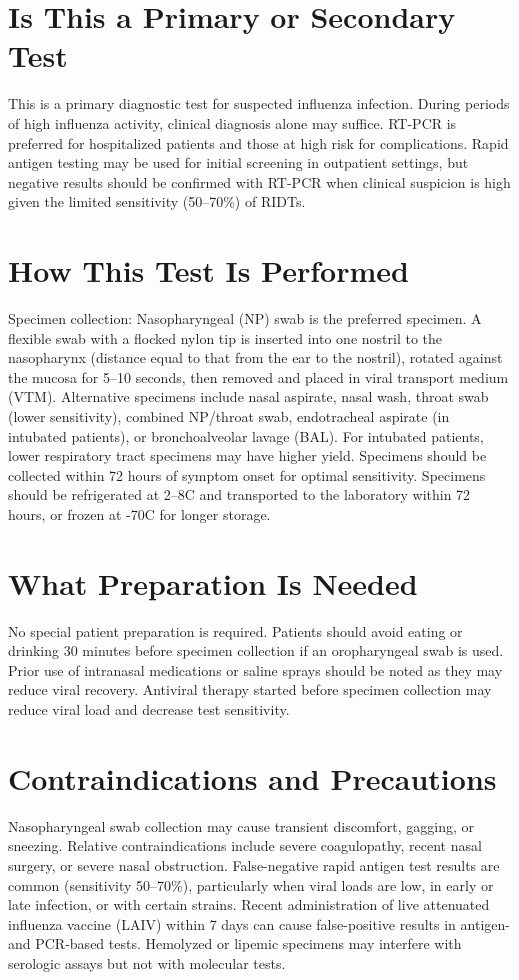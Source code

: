 \section*{Is This a Primary or Secondary Test}
This is a primary diagnostic test for suspected influenza infection. During periods of high influenza activity, clinical diagnosis alone may suffice. RT-PCR is preferred for hospitalized patients and those at high risk for complications. Rapid antigen testing may be used for initial screening in outpatient settings, but negative results should be confirmed with RT-PCR when clinical suspicion is high given the limited sensitivity (50--70\%) of RIDTs.

\section*{How This Test Is Performed}
Specimen collection: Nasopharyngeal (NP) swab is the preferred specimen. A flexible swab with a flocked nylon tip is inserted into one nostril to the nasopharynx (distance equal to that from the ear to the nostril), rotated against the mucosa for 5--10 seconds, then removed and placed in viral transport medium (VTM). Alternative specimens include nasal aspirate, nasal wash, throat swab (lower sensitivity), combined NP/throat swab, endotracheal aspirate (in intubated patients), or bronchoalveolar lavage (BAL). For intubated patients, lower respiratory tract specimens may have higher yield. Specimens should be collected within 72 hours of symptom onset for optimal sensitivity. Specimens should be refrigerated at 2--8\textdegree{}C and transported to the laboratory within 72 hours, or frozen at -70\textdegree{}C for longer storage.

\section*{What Preparation Is Needed}
No special patient preparation is required. Patients should avoid eating or drinking 30 minutes before specimen collection if an oropharyngeal swab is used. Prior use of intranasal medications or saline sprays should be noted as they may reduce viral recovery. Antiviral therapy started before specimen collection may reduce viral load and decrease test sensitivity.

\section*{Contraindications and Precautions}
Nasopharyngeal swab collection may cause transient discomfort, gagging, or sneezing. Relative contraindications include severe coagulopathy, recent nasal surgery, or severe nasal obstruction. False-negative rapid antigen test results are common (sensitivity 50--70\%), particularly when viral loads are low, in early or late infection, or with certain strains. Recent administration of live attenuated influenza vaccine (LAIV) within 7 days can cause false-positive results in antigen- and PCR-based tests. Hemolyzed or lipemic specimens may interfere with serologic assays but not with molecular tests.

